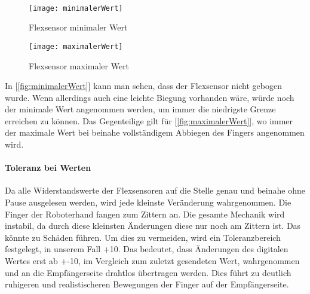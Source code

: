 \documentclass[titlepage,12pt,twoside]{article}
\begin{document}
\\
\begin{figure}[H]
	\begin{center}
		\scalebox{0.55}
		{\texttt{[image: minimalerWert]}}
		\caption{Flexsensor minimaler Wert}
		\label{fig:minimalerWert}			
	\end{center}
\end{figure}
\begin{figure}[H]
	\begin{center}
		\scalebox{0.55}
		{\texttt{[image: maximalerWert]}}
		\caption{Flexsensor maximaler Wert}
		\label{fig:maximalerWert}			
	\end{center}
\end{figure}
\hfill \break
In [\textcolor{blue}{\autoref{fig:minimalerWert}}] kann man sehen, dass der Flexsensor nicht gebogen wurde. Wenn allerdings auch eine leichte Biegung vorhanden wäre, würde noch der 
minimale Wert angenommen werden, um immer die niedrigste Grenze erreichen zu können. Das Gegenteilige gilt für [\textcolor{blue}{\autoref{fig:maximalerWert}}], wo immer der maximale 
Wert bei beinahe vollständigem Abbiegen des Fingers angenommen wird. \\
\paragraph{Toleranz bei Werten}
\hfill \break
\hfill \break
Da alle Widerstandswerte der Flexsensoren auf die Stelle genau und beinahe ohne 
Pause ausgelesen werden, wird jede kleinste Veränderung wahrgenommen. Die 
Finger der Roboterhand fangen zum Zittern an. Die gesamte Mechanik wird instabil, 
da durch diese kleinsten Änderungen diese nur noch am Zittern ist. Das könnte 
zu Schäden führen. Um dies zu vermeiden, wird ein Toleranzbereich festgelegt, 
in unserem Fall +10. Das bedeutet, dass Änderungen des digitalen Wertes erst 
ab +-10, im Vergleich zum zuletzt gesendeten Wert, wahrgenommen und an die 
Empfängerseite drahtlos übertragen werden. Dies führt zu deutlich ruhigeren 
und realistischeren Bewegungen der Finger auf der Empfängerseite. \\
\\
\end{document}
